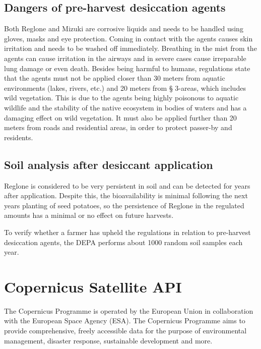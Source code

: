 \subsection{Dangers of pre-harvest desiccation agents} \label{Dangers of pre-harvest desiccation agents}
Both Reglone and Mizuki are corrosive liquids and needs to be handled using gloves, masks and eye protection. Coming in contact with the agents causes skin irritation and needs to be washed off immediately. Breathing in the mist from the agents can cause irritation in the airways and in severe cases cause irreparable lung damage or even death\cite{Middeldatabasen}.
Besides being harmful to humans, regulations state that the agents must not be applied closer than 30 meters from aquatic environments (lakes, rivers, etc.) and 20 meters from § 3-areas, which includes wild vegetation\cite{Paragraf3}\cite{Middeldatabasen}. This is due to the agents being highly poisonous to aquatic wildlife and the stability of the native ecosystem in bodies of waters and has a damaging effect on wild vegetation\cite{Middeldatabasen}. It must also be applied further than 20 meters from roads and residential areas, in order to protect passer-by and residents\cite{Middeldatabasen}.

\subsection{Soil analysis after desiccant application}\label{Soil analysis after desiccant application}
Reglone is considered to be very persistent in soil and can be detected for years after application\cite{reglone_sds_2023}. Despite this, the bioavailability is minimal following the next years planting of seed potatoes, so the persistence of Reglone in the regulated amounts has a minimal or no effect on future harvests\cite{fao_diquat_2013}.

To verify whether a farmer has upheld the regulations in relation to pre-harvest desiccation agents, the \acrshort{DEPA} performs about 1000 random soil samples each year\cite{MiljoeOgFoedevareministeriet}. 

\section{Copernicus Satellite API}\label{Copernicus Satellite API}
The Copernicus Programme is operated by the European Union in collaboration with the European Space Agency (ESA)\cite{copernicus_about}. The Copernicus Programme aims to provide comprehensive, freely accessible data for the purpose of environmental management, disaster response, sustainable development and more. 


